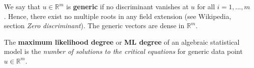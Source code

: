 \documentclass[a4paper, 11pt]{article}
\begin{document}
\begin{defi}[Generic]
  We say that \( u \in \mathbb R^m \) is \textbf{generic} if no discriminant vanishes at \( u \) for all \( i=1,...,m \). Hence, there exist no multiple roots in any field extension (see Wikipedia, section \emph{Zero discriminant}). The generic vectors are dense in \( \mathbb R^m \).
\end{defi}

\begin{defi}
  The \textbf{maximum likelihood degree} or \textbf{ML degree} of an algebraic statistical model is the \emph{number of solutions to the critical equations} for generic data point \( u \in \mathbb R^m \).
\end{defi}
\end{document}
